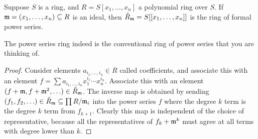 \begin{definition}
    Suppose \(S\) is a ring, and \(R = S[x_1,\hdots,x_n]\) a polynomial ring over \(S\).
    If \(\mathfrak{m} = (x_1,\hdots,x_n) \subseteq R\) is an ideal,
    then \(\hat{R}_{\mathfrak{m}} = S[[x_1,\hdots,x_n]]\) is the ring of formal power series.
\end{definition}
\begin{lemma}
    The power series ring indeed is the conventional ring of power series that you are thinking of.
\end{lemma}
\begin{proof}
    Consider elements \(a_{i_1,\hdots,i_n} \in R\) called coefficients,
    and associate this with an element \(f = \sum a_{i_1,\hdots,i_n} x_1^{i_1} \cdots x_n^{i_n}\).
    Associate this with an element \((f+\mathfrak{m},f+\mathfrak{m}^2,\hdots) \in \hat{R}_{\mathfrak{m}}\).
    The inverse map is obtained by sending \((f_1,f_2,\hdots) \in \hat{R}_{\mathfrak{m}} \subseteq \prod R/\mathfrak{m}_i\)
    into the power series \(f\) where the degree \(k\) term is the degree \(k\) term from \(f_{k+1}\).
    Clearly this map is independent of the choice of representative,
    because all the representatives of \(f_k+\mathfrak{m}^k\) must agree at all terms with degree lower than \(k\).
\end{proof}

